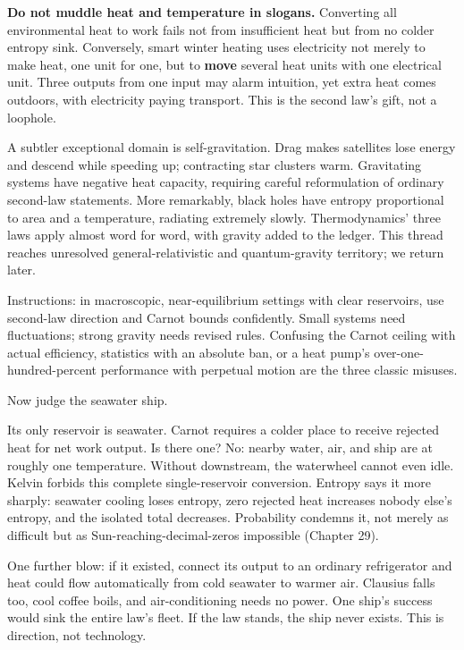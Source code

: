 \textbf{Do not muddle heat and temperature in slogans.} Converting all environmental heat to work fails not from insufficient heat but from no colder entropy sink. Conversely, smart winter heating uses electricity not merely to make heat, one unit for one, but to \textbf{move} several heat units with one electrical unit. Three outputs from one input may alarm intuition, yet extra heat comes outdoors, with electricity paying transport. This is the second law's gift, not a loophole.

\begin{challenge}
A subtler exceptional domain is self-gravitation. Drag makes satellites lose energy and descend while speeding up; contracting star clusters warm. Gravitating systems have negative heat capacity, requiring careful reformulation of ordinary second-law statements. More remarkably, black holes have entropy proportional to area and a temperature, radiating extremely slowly. Thermodynamics' three laws apply almost word for word, with gravity added to the ledger. This thread reaches unresolved general-relativistic and quantum-gravity territory; we return later.
\end{challenge}

\begin{mainline}
Instructions: in macroscopic, near-equilibrium settings with clear reservoirs, use second-law direction and Carnot bounds confidently. Small systems need fluctuations; strong gravity needs revised rules. Confusing the Carnot ceiling with actual efficiency, statistics with an absolute ban, or a heat pump's over-one-hundred-percent performance with perpetual motion are the three classic misuses.
\end{mainline}


Now judge the seawater ship.

Its only reservoir is seawater. Carnot requires a colder place to receive rejected heat for net work output. Is there one? No: nearby water, air, and ship are at roughly one temperature. Without downstream, the waterwheel cannot even idle. Kelvin forbids this complete single-reservoir conversion. Entropy says it more sharply: seawater cooling loses entropy, zero rejected heat increases nobody else's entropy, and the isolated total decreases. Probability condemns it, not merely as difficult but as Sun-reaching-decimal-zeros impossible (Chapter 29).

One further blow: if it existed, connect its output to an ordinary refrigerator and heat could flow automatically from cold seawater to warmer air. Clausius falls too, cool coffee boils, and air-conditioning needs no power. One ship's success would sink the entire law's fleet. If the law stands, the ship never exists. This is direction, not technology.

